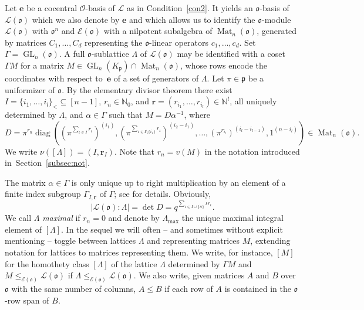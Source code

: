 \documentclass[11pt]{amsart}
\numberwithin{equation}{section}
\numberwithin{figure}{section}
\theoremstyle{plain}
\theoremstyle{definition}
\theoremstyle{remark}
\begin{document}
Let ${\ensuremath{\mathbf{e}}}$ be a cocentral ${\ensuremath{\mathcal{O}}}$-basis of ${\ensuremath{\mathcal{L}}}$ as in
Condition~\ref{con2}. It yields an ${\mathfrak o}$-basis of ${\ensuremath{\mathcal{L}}}({\mathfrak o})$ which
we also denote by ${\ensuremath{\mathbf{e}}}$ and which allows us to identify the
${\mathfrak o}$-module ${\ensuremath{\mathcal{L}}}({\mathfrak o})$ with ${\mathfrak o}^n$ and ${\mathcal{E}}({\mathfrak o})$ with a
nilpotent subalgebra of $\operatorname{Mat}_n({\mathfrak o})$, generated by matrices
$C_1,\dots,C_d$ representing the ${\mathfrak o}$-linear operators
$c_1,\dots,c_d$.  Set $\Gamma = \operatorname{GL}_n({\mathfrak o})$. A full ${\mathfrak o}$-sublattice
$\Lambda$ of ${\ensuremath{\mathcal{L}}}({\mathfrak o})$ may be identified with a coset $\Gamma M$
for a matrix $M\in\operatorname{GL}_n(K_{\mathfrak{p}})\cap \operatorname{Mat}_n({\mathfrak o})$, whose rows encode
the coordinates with respect to~${\ensuremath{\mathbf{e}}}$ of a set of generators of
$\Lambda$. Let $\pi\in{\mathfrak{p}}$ be a uniformizer of ${\mathfrak o}$. By the
elementary divisor theorem there exist
$I=\{i_1,\dots,i_l\}_<\subseteq[n-1]$, $r_n\in{\ensuremath{\mathbb{N}}}_0$, and
${\ensuremath{\mathbf{r}}}=(r_{i_1},\dots,r_{i_l})\in{\ensuremath{\mathbb{N}}}^l$, all uniquely determined by
$\Lambda$, and $\alpha\in \Gamma$ such that $M=D\alpha^{-1}$, where
\begin{equation}\label{equ:diagonal}
  D = \pi^{r_n} \operatorname{diag}((\pi^{\sum_{\iota\in I}r_\iota})^{(i_1)},(\pi^{\sum_{\iota\in I \setminus\{i_1\}}r_\iota})^{(i_2-i_1)},\dots,(\pi^{r_{i_l}})^{(i_l-i_{l-1})},1^{(n-i_l)})\in\operatorname{Mat}_n({\mathfrak o}).
\end{equation}
We write $\nu([\Lambda])=(I,{\ensuremath{\mathbf{r}}}_I)$. Note that $r_n = v(M)$ in the
notation introduced in~Section~\ref{subsec:not}.

The matrix $\alpha\in\Gamma$ is only unique up to right multiplication
by an element of a finite index subgroup $\Gamma_{I,{\ensuremath{\mathbf{r}}}}$ of
$\Gamma$; see \cite[Section~3.1]{Voll/10} for details. Obviously,
\begin{equation}\label{equ:index}
  |{\ensuremath{\mathcal{L}}}({\mathfrak o}):\Lambda| = \det D = q^{\sum_{\iota\in I\cup\{n\}}\iota
    r_\iota}.
\end{equation}
We call $\Lambda$ \emph{maximal} if $r_n=0$ and denote by
$\Lambda_{\max}$ the unique maximal integral element of $[\Lambda]$.
In the sequel we will often -- and sometimes without explicit
mentioning -- toggle between lattices $\Lambda$ and representing
matrices $M$, extending notation for lattices to matrices representing
them. We write, for instance, $[M]$ for the homothety class
$[\Lambda]$ of the lattice $\Lambda$ determined by $\Gamma M$ and $M
\leq_{{\mathcal{E}}({\mathfrak o})} {\ensuremath{\mathcal{L}}}({\mathfrak o})$ if $\Lambda
\leq_{{\mathcal{E}}({\mathfrak o})}{\ensuremath{\mathcal{L}}}({\mathfrak o})$.  We also write, given matrices $A$ and
$B$ over ${\mathfrak o}$ with the same number of columns, $A \leq B$ if each
row of $A$ is contained in the ${\mathfrak o}$-row span of $B$.
\end{document}
